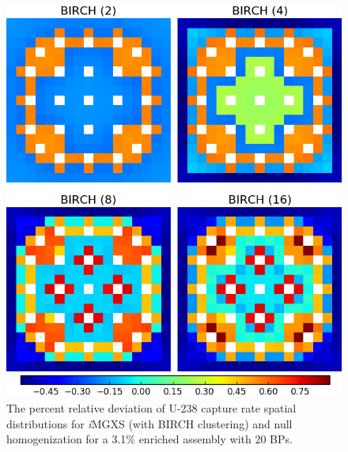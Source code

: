 \begin{figure}[h!]
\centering
\includegraphics[width=0.9\linewidth]{figures/results/compare/assm-31-20BPs/compare-capt}
\vspace{2mm}
\caption[U-238 capture rate \textit{i}MGXS-to-null relative deviations]{The percent relative deviation of U-238 capture rate spatial distributions for \textit{i}\ac{MGXS} (with BIRCH clustering) and null homogenization for a 3.1\% enriched assembly with 20 \acp{BP}.}
\label{fig:chap11-assm-31-20BPs-capt-rates-comp}
\end{figure}
	
\clearpage

